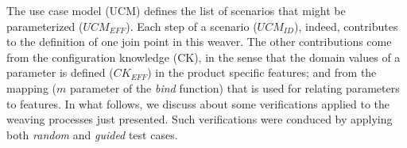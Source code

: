 \documentclass{acm_proc_article-sp}
\begin{document}
The use case model (UCM) defines the list of scenarios that might be parameterized ($UCM_{EFF}$). Each step of a scenario ($UCM_{ID}$), indeed, contributes to the definition of one join point in this weaver. The 
other contributions come from the configuration knowledge (CK), in the sense that the domain values 
of a parameter is defined ($CK_{EFF}$) in the product specific features; and from the mapping ($m$ parameter of the \emph{bind} function) that is used for relating parameters to features. 
In what follows, we discuss about some verifications applied to the weaving processes just presented. Such verifications were conduced by applying both \emph{random} and \emph{guided} test cases.

% 
% 
% 
\end{document}

